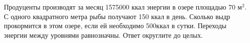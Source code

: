
Продуценты
производят за месяц 1575000 ккал энергии в озере площадью 70 м$^2$. С
одного квадратного метра рыбы получают 150 ккал в день. Сколько выдр
прокормится в этом озере, если ей необходимо 500ккал в сутки. Переходы энергии
между уровнями равнозначны. Ответ округлите до целых.

\explanationSection

